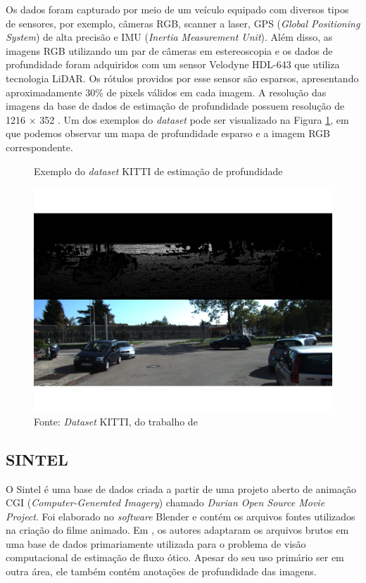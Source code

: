 Os dados foram capturado por meio de um veículo equipado com diversos tipos de sensores, por exemplo, câmeras RGB, scanner a laser, GPS (\textit{Global Positioning System}) de alta precisão e IMU (\textit{Inertia Measurement Unit}). Além disso, as imagens RGB utilizando um par de câmeras em estereoscopia e os dados de profundidade foram adquiridos com um sensor Velodyne HDL-643 que utiliza tecnologia LiDAR. Os rótulos providos por esse sensor são esparsos, apresentando aproximadamente 30\% de pixels válidos em cada imagem. A resolução das imagens da base de dados de estimação de profundidade possuem resolução de 1216 $\times$ 352 \cite{lahiri2024deep}. Um dos exemplos do \textit{dataset} pode ser visualizado na Figura \ref{fig:kittiexample}, em que podemos observar um mapa de profundidade esparso e a imagem RGB correspondente.

\begin{figure}[h]
    \centering
    \caption{Exemplo do \textit{dataset} KITTI de estimação de profundidade}
    \includegraphics[width=.8\textwidth]{fig/example_kitti.png}
    \caption*{Fonte: \textit{Dataset} KITTI, do trabalho de }
    \label{fig:kittiexample}
\end{figure}


\subsection{SINTEL}

O Sintel é uma base de dados criada a partir de uma projeto aberto de animação CGI (\textit{Computer-Generated Imagery}) chamado \textit{Durian Open Source Movie Project}. Foi elaborado no \textit{software} Blender e contém os arquivos fontes utilizados na criação do filme animado. Em \cite{wulff2012lessons}, os autores adaptaram os arquivos brutos em uma base de dados primariamente utilizada para o problema de visão computacional de estimação de fluxo ótico. Apesar do seu uso primário ser em outra área, ele também contém anotações de profundidade das imagens.

